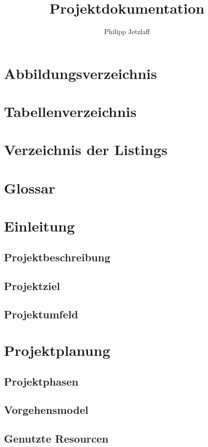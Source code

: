\documentclass[12pt,oneside]{article}
\author{Philipp Jetzlaff}
\title{Projektdokumentation}
\begin{document}
  \pagestyle{fancy}
  \tableofcontents
  \newpage
  \section{Abbildungsverzeichnis}
  \newpage
  \section{Tabellenverzeichnis}
  \newpage
  \section{Verzeichnis der Listings}
  \newpage
  \section{Glossar}
  \newpage
  \section{Einleitung}
  \subsection{Projektbeschreibung}
  \subsection{Projektziel}
  \subsection{Projektumfeld}
  \section{Projektplanung}
  \subsection{Projektphasen}
  \subsection{Vorgehensmodel}
  \subsection{Genutzte Resourcen}
\end{document}
